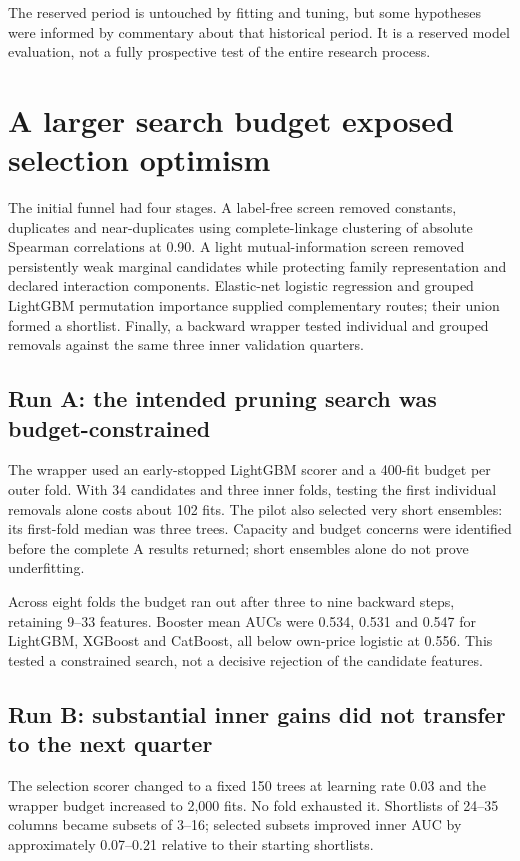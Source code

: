 \documentclass[11pt,a4paper]{article}
\begin{document}
The reserved period is untouched by fitting and tuning, but some hypotheses were informed by commentary about that historical period. It is a reserved model evaluation, not a fully prospective test of the entire research process.

\nextpage
\section*{A larger search budget exposed selection optimism}
The initial funnel had four stages. A label-free screen removed constants, duplicates and near-duplicates using complete-linkage clustering of absolute Spearman correlations at 0.90. A light mutual-information screen removed persistently weak marginal candidates while protecting family representation and declared interaction components. Elastic-net logistic regression and grouped LightGBM permutation importance supplied complementary routes; their union formed a shortlist. Finally, a backward wrapper tested individual and grouped removals against the same three inner validation quarters.

\subsection*{Run A: the intended pruning search was budget-constrained}
The wrapper used an early-stopped LightGBM scorer and a 400-fit budget per outer fold. With 34 candidates and three inner folds, testing the first individual removals alone costs about 102 fits. The pilot also selected very short ensembles: its first-fold median was three trees. Capacity and budget concerns were identified before the complete A results returned; short ensembles alone do not prove underfitting.

Across eight folds the budget ran out after three to nine backward steps, retaining 9--33 features. Booster mean AUCs were 0.534, 0.531 and 0.547 for LightGBM, XGBoost and CatBoost, all below own-price logistic at 0.556. This tested a constrained search, not a decisive rejection of the candidate features.

\subsection*{Run B: substantial inner gains did not transfer to the next quarter}
The selection scorer changed to a fixed 150 trees at learning rate 0.03 and the wrapper budget increased to 2,000 fits. No fold exhausted it. Shortlists of 24--35 columns became subsets of 3--16; selected subsets improved inner AUC by approximately 0.07--0.21 relative to their starting shortlists.
\end{document}
